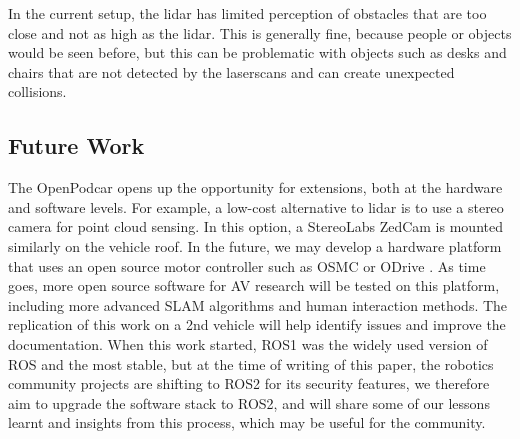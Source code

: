 \documentclass[a4paper]{article}
\begin{document}
	In the current setup, the lidar has limited perception of obstacles that are too close and not as high as the lidar. This is generally fine, because people or objects would be seen before, but this can be problematic with objects such as desks and chairs that are not detected by the laserscans and can create unexpected collisions.
	
	\subsection{Future Work}\label{h.neocsr410zj}
	
	
	The OpenPodcar opens up the opportunity for extensions, both at the hardware and software levels. For example, a low-cost alternative to lidar is to use a stereo camera for point cloud sensing. In this option, a StereoLabs ZedCam is mounted similarly on the vehicle roof. In the future, we may develop a hardware platform that uses an open source motor controller such as OSMC \cite{robotpoweropen} or ODrive \cite{oriveroboticsodrive}. As time goes, more open source software for AV research will be tested on this platform, including more advanced SLAM algorithms and human interaction methods.
	The replication of this work on a 2nd vehicle will help identify issues and improve the documentation. When this work started, ROS1 was the widely used version of ROS and the most stable, but at the time of writing of this paper, the robotics community projects are shifting to ROS2 for its security features, we therefore aim to upgrade the software stack to ROS2, and will share some of our lessons learnt and insights from this process, which may be useful for the community. 
	
	
	
	
\end{document}
